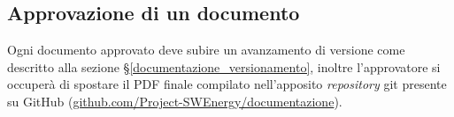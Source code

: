 \subsection{Approvazione di un documento}
Ogni documento approvato deve subire un avanzamento di versione come descritto alla sezione \S\ref{documentazione_versionamento}, inoltre l'approvatore si occuperà di spostare il PDF finale compilato nell'apposito \textit{repository} git presente su GitHub (\href{https://github.com/Project-SWEnergy/documentazione}{github.com/Project-SWEnergy/documentazione}).